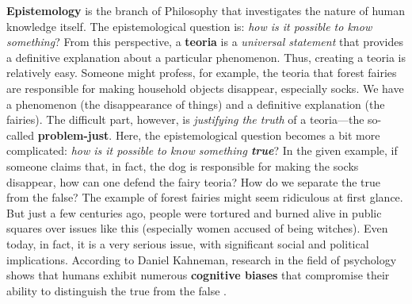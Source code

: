 \documentclass[./main_en.tex]{subfiles}
\begin{document}
\par \textbf{Epistemology} is the branch of Philosophy that investigates the nature of human knowledge itself. The epistemological question is: \textit{how is it possible to know something}? From this perspective, a \textbf{\gls{teoria}} is a \textit{universal statement} that provides a definitive explanation about a particular phenomenon. Thus, creating a \gls{teoria} is relatively easy. Someone might profess, for example, the \gls{teoria} that forest fairies are responsible for making household objects disappear, especially socks. We have a phenomenon (the disappearance of things) and a definitive explanation (the fairies). The difficult part, however, is \textit{justifying the truth} of a \gls{teoria}—the so-called \textbf{\gls{problem-just}}. Here, the epistemological question becomes a bit more complicated: \textit{how is it possible to know something \textbf{true}}? In the given example, if someone claims that, in fact, the dog is responsible for making the socks disappear, how can one defend the fairy \gls{teoria}? How do we separate the true from the false? The example of forest fairies might seem ridiculous at first glance. But just a few centuries ago, people were tortured and burned alive in public squares over issues like this (especially women accused of being witches). Even today, in fact, it is a very serious issue, with significant social and political implications. According to Daniel Kahneman, research in the field of psychology shows that humans exhibit numerous \textbf{cognitive biases} that compromise their ability to distinguish the true from the false \cite{kahneman2011}.
\end{document}
